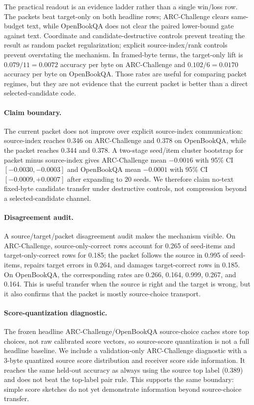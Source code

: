 \documentclass{article}
\newcommand{\arc}{ARC-Challenge}
\newcommand{\obqa}{OpenBookQA}
\begin{document}
The practical readout is an evidence ladder rather than a single win/loss row. The packets beat target-only on both headline rows; \arc{} clears same-budget text, while \obqa{} does not clear the paired lower-bound gate against text. Coordinate and candidate-destructive controls prevent treating the result as random packet regularization; explicit source-index/rank controls prevent overstating the mechanism. In framed-byte terms, the target-only lift is $0.079/11=0.0072$ accuracy per byte on \arc{} and $0.102/6=0.0170$ accuracy per byte on \obqa{}. Those rates are useful for comparing packet regimes, but they are not evidence that the current packet is better than a direct selected-candidate code.

\paragraph{Claim boundary.}
The current packet does not improve over explicit source-index communication: source-index reaches 0.346 on \arc{} and 0.378 on \obqa{}, while the packet reaches 0.344 and 0.378. A two-stage seed/item cluster bootstrap for packet minus source-index gives \arc{} mean $-0.0016$ with 95\% CI $[-0.0030,-0.0003]$ and \obqa{} mean $-0.0001$ with 95\% CI $[-0.0009,+0.0007]$ after expanding to 20 seeds. We therefore claim no-text fixed-byte candidate transfer under destructive controls, not compression beyond a selected-candidate channel.

\paragraph{Disagreement audit.}
A source/target/packet disagreement audit makes the mechanism visible. On \arc{}, source-only-correct rows account for 0.265 of seed-items and target-only-correct rows for 0.185; the packet follows the source in 0.995 of seed-items, repairs target errors in 0.264, and damages target-correct rows in 0.185. On \obqa{}, the corresponding rates are 0.266, 0.164, 0.999, 0.267, and 0.164. This is useful transfer when the source is right and the target is wrong, but it also confirms that the packet is mostly source-choice transport.

\paragraph{Score-quantization diagnostic.}
The frozen headline \arc{}/\obqa{} source-choice caches store top choices, not raw calibrated score vectors, so source-score quantization is not a full headline baseline. We include a validation-only \arc{} diagnostic with a 3-byte quantized source score distribution and receiver score side information. It reaches the same held-out accuracy as always using the source top label (0.389) and does not beat the top-label pair rule. This supports the same boundary: simple score sketches do not yet demonstrate information beyond source-choice transfer.
\end{document}

